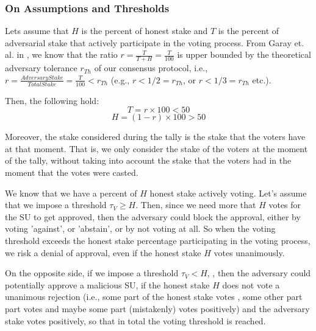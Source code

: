 \subsubsection{On Assumptions and Thresholds}
Lets assume that $H$ is the percent of honest stake and $T$ is the percent of adversarial stake that actively participate in the voting process. From Garay et. al. in \cite{sok}, we know that the ratio $r = \frac{T}{T+H} = \frac{T}{100}$ is upper bounded by the theoretical adversary tolerance $r_{Th}$ of our consensus protocol, i.e., $r = \frac{AdversaryStake}{TotalStake} = \frac{T}{100} < r_{Th}$ (e.g., $r < 1/2 = r_{Th}$, or $r < 1/3 = r_{Th}$ etc.).

Then, the following hold:
\begin{equation} \label{eq1}
T = r \times 100 < 50
\end{equation}
\begin{equation} \label{eq2}
H = (1-r) \times 100 > 50
\end{equation}

Moreover, the stake considered during the tally is the stake that the voters have at that moment. That is, we only consider the stake of the voters at the moment of the tally, without taking into account the stake that the voters had in the moment that the votes were casted. %

We know that we have a percent of $H$ honest stake actively voting. Let's assume that we impose a threshold $\tau_V \geq H$. Then, since we need more that $H$ votes for the SU to get approved, then the adversary could block the approval, either by voting 'against', or 'abstain', or by not voting at all. So when the voting threshold exceeds the honest stake percentage participating in the voting process, we risk a denial of approval, even if the honest stake $H$ votes unanimously.


On the opposite side, if we impose a threshold $\tau_V < H$,
, then the adversary could potentially approve a malicious SU, if the honest stake $H$ does not vote a unanimous rejection (i.e., some part of the honest stake votes , some other part part votes  and maybe some part (mistakenly) votes positively) and the adversary stake votes positively, so that in total the voting threshold is reached.

